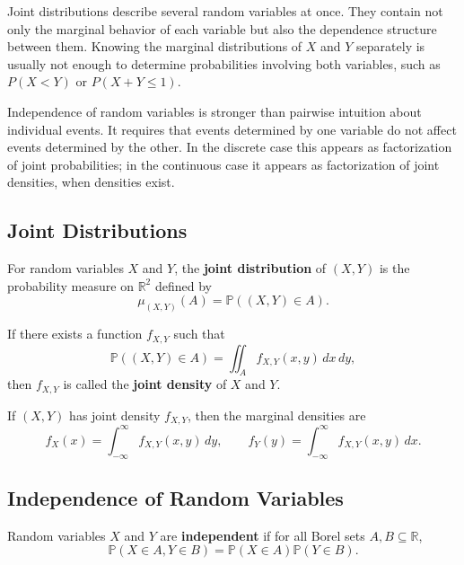 Joint distributions describe several random variables at once. They contain not only the marginal behavior of each variable but also the dependence structure between them. Knowing the marginal distributions of $X$ and $Y$ separately is usually not enough to determine probabilities involving both variables, such as $P(X<Y)$ or $P(X+Y\leq 1)$.

Independence of random variables is stronger than pairwise intuition about individual events. It requires that events determined by one variable do not affect events determined by the other. In the discrete case this appears as factorization of joint probabilities; in the continuous case it appears as factorization of joint densities, when densities exist.

\subsection{Joint Distributions}

\begin{definition}
For random variables $X$ and $Y$, the \textbf{joint distribution} of $(X,Y)$ is the probability measure on $\mathbb{R}^2$ defined by
\[
    \mu_{(X,Y)}(A)=\mathbb{P}((X,Y)\in A).
\]
\end{definition}

\begin{definition}
If there exists a function $f_{X,Y}$ such that
\[
    \mathbb{P}((X,Y)\in A)=\iint_A f_{X,Y}(x,y)\,dx\,dy,
\]
then $f_{X,Y}$ is called the \textbf{joint density} of $X$ and $Y$.
\end{definition}

\begin{definition}
If $(X,Y)$ has joint density $f_{X,Y}$, then the marginal densities are
\[
    f_X(x)=\int_{-\infty}^{\infty}f_{X,Y}(x,y)\,dy,
    \qquad
    f_Y(y)=\int_{-\infty}^{\infty}f_{X,Y}(x,y)\,dx.
\]
\end{definition}

\subsection{Independence of Random Variables}

\begin{definition}
Random variables $X$ and $Y$ are \textbf{independent} if for all Borel sets $A,B\subseteq\mathbb{R}$,
\[
    \mathbb{P}(X\in A,Y\in B)=\mathbb{P}(X\in A)\mathbb{P}(Y\in B).
\]
\end{definition}

